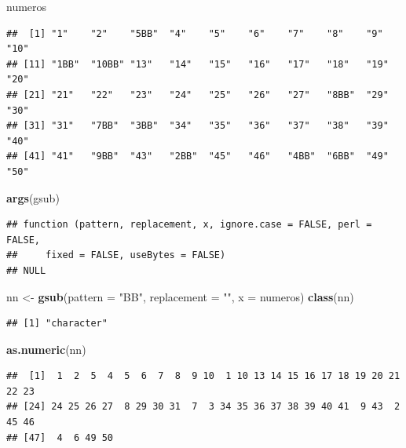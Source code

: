 \documentclass[]{book}
\newenvironment{Shaded}{\begin{snugshade}}{\end{snugshade}}
\newcommand{\KeywordTok}[1]{\textcolor[rgb]{0.13,0.29,0.53}{\textbf{#1}}}
\newcommand{\DataTypeTok}[1]{\textcolor[rgb]{0.13,0.29,0.53}{#1}}
\newcommand{\StringTok}[1]{\textcolor[rgb]{0.31,0.60,0.02}{#1}}
\newcommand{\NormalTok}[1]{#1}
\theoremstyle{definition}
\theoremstyle{definition}
\theoremstyle{definition}
\theoremstyle{remark}
\begin{document}
\begin{Shaded}
\begin{Highlighting}[]
\NormalTok{numeros}
\end{Highlighting}
\end{Shaded}

\begin{verbatim}
##  [1] "1"    "2"    "5BB"  "4"    "5"    "6"    "7"    "8"    "9"    "10"  
## [11] "1BB"  "10BB" "13"   "14"   "15"   "16"   "17"   "18"   "19"   "20"  
## [21] "21"   "22"   "23"   "24"   "25"   "26"   "27"   "8BB"  "29"   "30"  
## [31] "31"   "7BB"  "3BB"  "34"   "35"   "36"   "37"   "38"   "39"   "40"  
## [41] "41"   "9BB"  "43"   "2BB"  "45"   "46"   "4BB"  "6BB"  "49"   "50"
\end{verbatim}

\begin{Shaded}
\begin{Highlighting}[]
\KeywordTok{args}\NormalTok{(gsub)}
\end{Highlighting}
\end{Shaded}

\begin{verbatim}
## function (pattern, replacement, x, ignore.case = FALSE, perl = FALSE, 
##     fixed = FALSE, useBytes = FALSE) 
## NULL
\end{verbatim}

\begin{Shaded}
\begin{Highlighting}[]
\NormalTok{nn <-}\StringTok{ }\KeywordTok{gsub}\NormalTok{(}\DataTypeTok{pattern =} \StringTok{"BB"}\NormalTok{, }\DataTypeTok{replacement =} \StringTok{""}\NormalTok{, }\DataTypeTok{x =}\NormalTok{ numeros)}
\KeywordTok{class}\NormalTok{(nn)}
\end{Highlighting}
\end{Shaded}

\begin{verbatim}
## [1] "character"
\end{verbatim}

\begin{Shaded}
\begin{Highlighting}[]
\KeywordTok{as.numeric}\NormalTok{(nn)}
\end{Highlighting}
\end{Shaded}

\begin{verbatim}
##  [1]  1  2  5  4  5  6  7  8  9 10  1 10 13 14 15 16 17 18 19 20 21 22 23
## [24] 24 25 26 27  8 29 30 31  7  3 34 35 36 37 38 39 40 41  9 43  2 45 46
## [47]  4  6 49 50
\end{verbatim}
\end{document}
